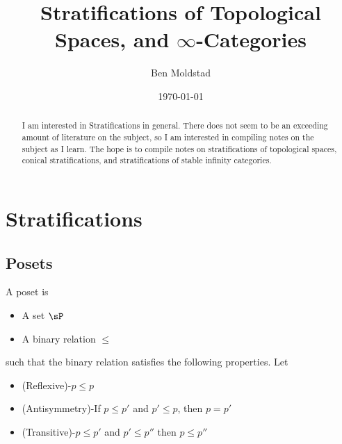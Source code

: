 \documentclass[reqno]{amsart}
\begin{document}
\title{Stratifications of Topological Spaces, and $\infty$-Categories}

\author{Ben Moldstad}

\date{\today}

\begin{abstract}
I am interested in Stratifications in general. There does not seem to be an exceeding amount of literature on the subject, so I am interested in compiling notes on the subject as I learn. The hope is to compile notes on stratifications of topological spaces, conical stratifications, and stratifications of stable infinity categories. 
\end{abstract}


\maketitle







\setcounter{tocdepth}{2}
\tableofcontents
\setcounter{tocdepth}{2}

\setcounter{section}{-1}

\section{Stratifications}
\label{section.intro}

\startcontents[sections]


\subsection{Posets}

\begin{definition}[Posets]
	A poset is 
	\begin{itemize}[label = +)]
	\item 	A set $\sP$
	\item A binary relation $\leq$
	\end{itemize}
	
	such that the binary relation satisfies the following properties. Let
	 
	\begin{itemize}[label=-)]
		\item (Reflexive)-$p\leq p$
		\item (Antisymmetry)-If $p\leq p'$ and $p'\leq p$, then $p=p'$
		\item (Transitive)-$p\leq p'$ and $p'\leq p''$ then $p\leq p''$  
	\end{itemize}

\end{definition}
\end{document}
